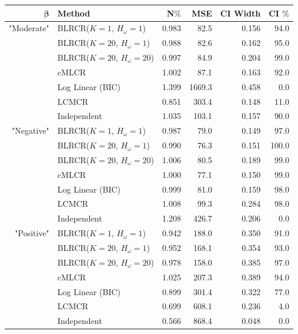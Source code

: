 \documentclass[
  12pt,
]{article}
\begin{document}
\singlespacing
\begin{table}[H]
\centering
\begin{tabular}{||r l r r r r||} 
 \hline
$\boldsymbol{\beta}$ & Method & N$\%$ &MSE & CI Width & CI $\%$   \\ [0.5ex] 
 \hline\hline
 "Moderate"    & BLRCR($K=1$, $H_\omega=1$)  & 0.983   & 82.5   & 0.156   & 94.0 \\ 
               &  BLRCR($K=20$, $H_\omega=1$)   & 0.988     & 82.6     & 0.162     & 95.0 \\ 
               & BLRCR($K=20$, $H_\omega=20$)    & 0.997     & 84.9     & 0.204     & 99.0 \\                
               & cMLCR       & 1.002       & 87.1      & 0.163      & 92.0 \\
               & Log Linear (BIC)  & 1.399      & 1669.3     & 0.458     & 0.0 \\ 
               & LCMCR       & 0.851       & 303.4      & 0.148      & 11.0 \\ 
               & Independent & 1.035 & 103.1& 0.157& 90.0 \\ 
               

                                  
 \hline
"Negative"    & BLRCR($K=1$, $H_\omega=1$)  & 0.987   & 79.0   & 0.149   & 97.0 \\ 
               & BLRCR($K=20$, $H_\omega=1$)    & 0.990     & 76.3     & 0.151     & 100.0 \\ 
                              & BLRCR($K=20$, $H_\omega=20$)    & 1.006     & 80.5     & 0.189     & 99.0 \\                
               & cMLCR       & 1.000       & 77.1      & 0.150      & 99.0 \\
               & Log Linear (BIC)  & 0.999      & 81.0     & 0.159     & 98.0 \\ 
               & LCMCR       & 1.008       & 99.3      & 0.284      & 98.0 \\ 
               & Independent & 1.208 & 426.7& 0.206& 0.0 \\

 \hline
 "Positive"    & BLRCR($K=1$, $H_\omega=1$)  & 0.942   & 188.0   & 0.350   & 91.0 \\ 
               & BLRCR($K=20$, $H_\omega=1$)    & 0.952     & 168.1     & 0.354     & 93.0 \\ 
               & BLRCR($K=20$, $H_\omega=20$)    & 0.978     & 158.0     & 0.385     & 97.0 \\                
               & cMLCR       & 1.025       & 207.3      & 0.389      & 94.0 \\
               & Log Linear (BIC)  & 0.899      & 301.4     & 0.322     & 77.0 \\ 
               & LCMCR       & 0.699       & 608.1      & 0.236      & 4.0 \\ 
               & Independent & 0.566 & 868.4& 0.048& 0.0 \\ 


\end{tabular}
\end{table}
\end{document}
